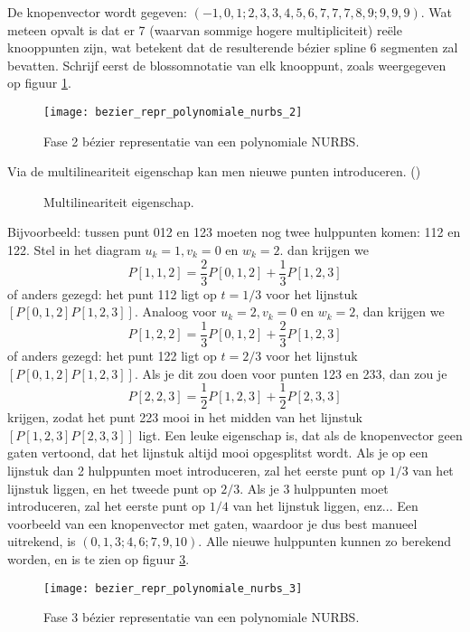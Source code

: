 \begin{itemize}
{\begin{itemize}
			De knopenvector wordt gegeven: $(-1, 0, 1 ; 2, 3, 3, 4, 5, 6, 7, 7, 7, 8, 9 ; 9, 9, 9)$. Wat meteen opvalt is dat er 7 (waarvan sommige hogere multipliciteit) reële knooppunten zijn, wat betekent dat de resulterende bézier spline 6 segmenten zal bevatten. Schrijf eerst de blossomnotatie van elk knooppunt, zoals weergegeven op figuur \ref {fig:bezier_repr_polynomiale_nurbs_2}.
			\begin{figure}[ht]
				\centering
				\texttt{[image: bezier\_repr\_polynomiale\_nurbs\_2]}	
				\caption{Fase 2 bézier representatie van een polynomiale NURBS.}
				\label{fig:bezier_repr_polynomiale_nurbs_2}
			\end{figure}

			Via de multilineariteit eigenschap kan men nieuwe punten introduceren. ()
			\begin{figure}[ht]
				\centering
				\caption{Multilineariteit eigenschap.}
				\label{fig:multilineariteit}
			\end{figure}	

			Bijvoorbeeld: tussen punt 012 en 123 moeten nog twee hulppunten komen: 112 en 122. Stel in het diagram $u_k = 1, v_k = 0$ en $w_k = 2$. dan krijgen we
			$$P[1,1,2] = \frac{2}{3}P[0,1,2] + \frac{1}{3}P[1,2,3]$$
			of anders gezegd: het punt 112 ligt op $t = 1/3$ voor het lijnstuk $[P[0,1,2]P[1,2,3]]$.
			Analoog voor $u_k = 2, v_k = 0$ en $w_k = 2$, dan krijgen we
			$$P[1,2,2] = \frac{1}{3}P[0,1,2] + \frac{2}{3}P[1,2,3]$$
			of anders gezegd: het punt 122 ligt op $t = 2/3$ voor het lijnstuk  $[P[0,1,2]P[1,2,3]]$.
			Als je dit zou doen voor punten 123 en 233, dan zou je 
			$$P[2, 2, 3] = \frac{1}{2}P[1,2,3] + \frac{1}{2}P[2,3,3]$$
			krijgen, zodat het punt 223 mooi in het midden van het lijnstuk $[P[1,2,3]P[2,3,3]]$ ligt. Een leuke eigenschap is, dat als de knopenvector geen gaten vertoond, dat het lijnstuk altijd mooi opgesplitst wordt. Als je op een lijnstuk dan 2 hulppunten moet introduceren, zal het eerste punt op $1/3$ van het lijnstuk liggen, en het tweede punt op $2/3$. Als je 3 hulppunten moet introduceren, zal het eerste punt op $1/4$ van het lijnstuk liggen, enz... Een voorbeeld van een knopenvector met gaten, waardoor je dus best manueel uitrekend, is $(0, 1, 3 ; 4, 6 ; 7, 9, 10)$. Alle nieuwe hulppunten kunnen zo berekend worden, en is te zien op figuur \ref{fig:bezier_repr_polynomiale_nurbs_3}.
			\begin{figure}[ht]
				\centering
				\texttt{[image: bezier\_repr\_polynomiale\_nurbs\_3]}	
				\caption{Fase 3 bézier representatie van een polynomiale NURBS.}
				\label{fig:bezier_repr_polynomiale_nurbs_3}
			\end{figure}


\end{itemize}}
\end{itemize}
